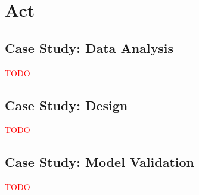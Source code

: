 \documentclass[../primer.tex]{subfiles}
\begin{document}
\chapter{Act} \label{ch:act}

\section{Case Study: Data Analysis}
\textcolor{red}{TODO}

\section{Case Study: Design}
\textcolor{red}{TODO}

\section{Case Study: Model Validation}
\textcolor{red}{TODO}
\end{document}
